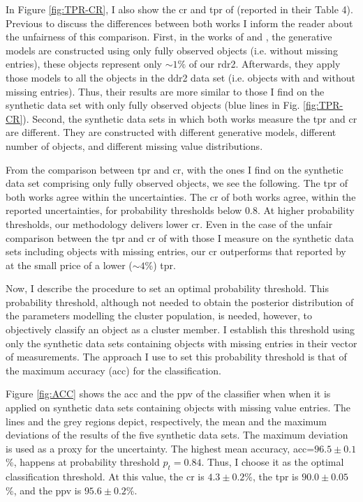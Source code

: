 In Figure \ref{fig:TPR-CR}, I also show the \gls{cr} and \gls{tpr} of \citet{Sarro2014} (reported in their Table 4). Previous to discuss the differences between both works I inform the reader about the unfairness of this comparison. First, in the works of \citet{Sarro2014} and \citet{Bouy2015}, the generative models are constructed using only fully observed objects (i.e. without missing entries), these objects represent only  $\sim 1\%$ of our \gls{rdr2}. Afterwards, they apply those models to all the objects in the \gls{ddr2} data set (i.e. objects with and without missing entries). Thus, their results are more similar to those I find on the synthetic data set with only fully observed objects (blue lines in Fig. \ref{fig:TPR-CR}). Second, the synthetic data sets in which both works measure the \gls{tpr} and \gls{cr} are different. They are constructed with different generative models, different number of objects, and different missing value distributions.

From the comparison between \citet{Sarro2014} \gls{tpr} and \gls{cr}, with the ones I find on the synthetic data set comprising only fully observed objects, we see the following. The \gls{tpr} of both works agree within the uncertainties. The \gls{cr} of both works agree, within the reported uncertainties, for probability thresholds below 0.8. At higher probability thresholds, our methodology delivers lower \gls{cr}. Even in the case of the unfair comparison between the \gls{tpr} and \gls{cr} of \citet{Sarro2014} with those I measure on the synthetic data sets including objects with missing entries, our \gls{cr} outperforms that reported by \citet{Sarro2014} at the small price of a lower ($\sim 4\%$) \gls{tpr}.

Now, I describe the procedure to set an optimal probability threshold. This probability threshold, although not needed to obtain the posterior distribution of the parameters modelling the cluster population, is needed, however, to objectively classify an object as a cluster member. I establish this threshold using only the synthetic data sets containing objects with missing entries in their vector of measurements.  The approach I use to set this probability threshold is that of the maximum accuracy (\gls{acc}) for the classification. 

Figure \ref{fig:ACC} shows the \gls{acc} and the \gls{ppv} of the classifier when when it is applied on synthetic data sets containing objects with missing value entries. The lines and the grey regions depict, respectively, the mean and the maximum deviations of the results of the five synthetic data sets. The maximum deviation is used as a proxy for the uncertainty. The highest mean accuracy, \gls{acc}=$96.5\pm0.1$\%, happens at probability threshold $p_t = 0.84$. Thus, I choose it as the optimal classification threshold. At this value, the \gls{cr} is $4.3\pm0.2$\%, the \gls{tpr} is $90.0\pm0.05$\%, and the \gls{ppv} is $95.6\pm0.2$\%. 

